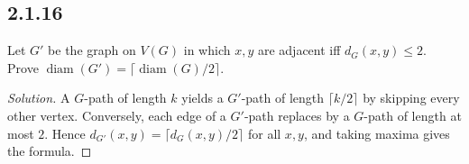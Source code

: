 \documentclass[12pt]{amsart}
\newenvironment{solution}{\begin{proof}[Solution]}{\end{proof}}
\begin{document}
    \subsection*{2.1.16} Let $G'$ be the graph on $V(G)$ in which $x,y$ are adjacent iff $d_G(x,y)\le2$. Prove $\operatorname{diam}(G')=\lceil\operatorname{diam}(G)/2\rceil$.
    \begin{solution}A $G$-path of length $k$ yields a $G'$-path of length $\lceil k/2\rceil$ by skipping every other vertex. Conversely, each edge of a $G'$-path replaces by a $G$-path of length at most $2$. Hence $d_{G'}(x,y)=\lceil d_G(x,y)/2\rceil$ for all $x,y$, and taking maxima gives the formula.\end{solution}
\end{document}
